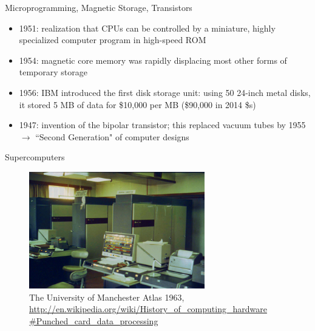 \documentclass[xcolor=x11names,compress]{beamer}
\renewcommand{\(}{\begin{columns}}
\renewcommand{\)}{\end{columns}}
\newcommand{\<}[1]{\begin{column}{#1}}
\renewcommand{\>}{\end{column}}
\begin{document}
\begin{frame}{Microprogramming, Magnetic Storage, Transistors}
\begin{itemize}
\item 1951: realization that CPUs can be controlled by a miniature, highly specialized computer program in high-speed ROM \vspace*{0.5 em}
\item 1954: magnetic core memory was rapidly displacing most other forms of temporary storage \vspace*{0.5 em}
\item 1956: IBM introduced the first disk storage unit: using 50 24-inch metal disks, it stored 5 MB of data for \$10,000 per MB (\$90,000 in 2014 \$s)\vspace*{0.5 em}
\item 1947: invention of the bipolar transistor; this replaced vacuum tubes by 1955 $\rightarrow$ ``Second Generation" of computer designs
\end{itemize}
\end{frame}

\begin{frame}{Supercomputers}

\begin{figure}
\includegraphics[height=2in,clip]{../figs/Atlas1963}
\caption{The University of Manchester Atlas 1963, \href{http://en.wikipedia.org/wiki/History_of_computing_hardware
\#Punched_card_data_processing}{http://en.wikipedia.org/wiki/History\_of\_computing\_hardware
\#Punched\_card\_data\_processing}}
\end{figure}

\end{frame}
\end{document}
